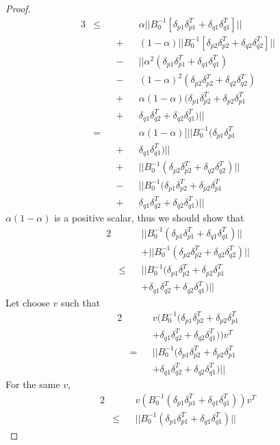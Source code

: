 \begin{proof}
\begin{alignat*}{3}
& \leq && && \alpha||B_0^{-1}[\delta_{p1}\delta_{p1}^T +
\delta_{q1}\delta_{q1}^T]||  \\
& && + && (1-\alpha)||B_0^{-1}[\delta_{p2}\delta_{p2}^T +
\delta_{q2}\delta_{q2}^T]|| \\
& && - && || \alpha^2(\delta_{p1}\delta_{p1}^T + \delta_{q1}\delta_{q1}^T) \\
& && - && (1-\alpha)^2(\delta_{p2}\delta_{p2}^T + \delta_{q2}\delta_{q2}^T) \\
& && + && \alpha(1-\alpha)(\delta_{p1}\delta_{p2}^T+\delta_{p2}\delta_{p1}^T \\
& && + && \delta_{q1}\delta_{q2}^T+\delta_{q2}\delta_{q1}^T) || \\
& = && && \alpha(1-\alpha)[||B_0^{-1}(\delta_{p1}\delta_{p1}^T \\
& && + && \delta_{q1}\delta_{q1}^T)||\\
& && + && ||B_0^{-1}(\delta_{p2}\delta_{p2}^T + \delta_{q2}\delta_{q2}^T)|| \\
& && - && ||B_0^{-1}(\delta_{p1}\delta_{p2}^T+\delta_{p2}\delta_{p1}^T \\
& && + && \delta_{q1}\delta_{q2}^T+\delta_{q2}\delta_{q1}^T)||
\end{alignat*}
$\alpha(1-\alpha)$ is a positive scalar, thus we should show that
\begin{alignat*}{2}
& && ||B_0^{-1}(\delta_{p1}\delta_{p1}^T + \delta_{q1}\delta_{q1}^T)|| \\
& && + ||B_0^{-1}(\delta_{p2}\delta_{p2}^T + \delta_{q2}\delta_{q2}^T)|| \\
& \leq &&  ||B_0^{-1}(\delta_{p1}\delta_{p2}^T+\delta_{p2}\delta_{p1}^T \\
& && +\delta_{q1}\delta_{q2}^T+\delta_{q2}\delta_{q1}^T)||
\end{alignat*}
Let choose $v$ such that
\begin{alignat*}{2}
& && v(B_0^{-1}(\delta_{p1}\delta_{p2}^T+\delta_{p2}\delta_{p1}^T\\
& &&+\delta_{q1}\delta_{q2}^T+\delta_{q2}\delta_{q1}^T))v^T \\
& = &&||B_0^{-1}(\delta_{p1}\delta_{p2}^T+\delta_{p2}\delta_{p1}^T\\
& && + \delta_{q1}\delta_{q2}^T+\delta_{q2}\delta_{q1}^T)||
\end{alignat*}
For the same $v$,
\begin{alignat*}{2}
 & && v(B_0^{-1}(\delta_{p1}\delta_{p1}^T + \delta_{q1}\delta_{q1}^T))v^T \\
& \leq && ||B_0^{-1}(\delta_{p1}\delta_{p1}^T + \delta_{q1}\delta_{q1}^T)||

\end{alignat*}
\end{proof}
